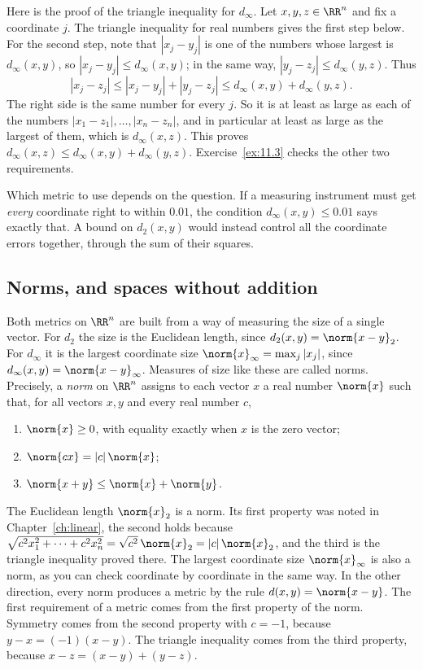 Here is the proof of the triangle inequality for $d_\infty$. Let $x,y,z\in\RR^n$ and fix a coordinate $j$. The triangle inequality for real numbers gives the first step below. For the second step, note that $|x_j-y_j|$ is one of the numbers whose largest is $d_\infty(x,y)$, so $|x_j-y_j|\le d_\infty(x,y)$; in the same way, $|y_j-z_j|\le d_\infty(y,z)$. Thus
\[
|x_j-z_j|\le|x_j-y_j|+|y_j-z_j|\le d_\infty(x,y)+d_\infty(y,z).
\]
The right side is the same number for every $j$. So it is at least as large as each of the numbers $|x_1-z_1|,\ldots,|x_n-z_n|$, and in particular at least as large as the largest of them, which is $d_\infty(x,z)$. This proves $d_\infty(x,z)\le d_\infty(x,y)+d_\infty(y,z)$. Exercise~\ref{ex:11.3} checks the other two requirements.

Which metric to use depends on the question. If a measuring instrument must get \emph{every} coordinate right to within $0.01$, the condition $d_\infty(x,y)\le0.01$ says exactly that. A bound on $d_2(x,y)$ would instead control all the coordinate errors together, through the sum of their squares.

\subsection*{Norms, and spaces without addition}
Both metrics on $\RR^n$ are built from a way of measuring the size of a single vector. For $d_2$ the size is the Euclidean length, since $d_2(x,y)=\norm{x-y}_2$. For $d_\infty$ it is the largest coordinate size $\norm{x}_\infty=\max_j|x_j|$, since $d_\infty(x,y)=\norm{x-y}_\infty$. Measures of size like these are called norms. Precisely, a \emph{norm} on $\RR^n$ assigns to each vector $x$ a real number $\norm{x}$ such that, for all vectors $x,y$ and every real number $c$,
\begin{enumerate}
\item $\norm{x}\ge0$, with equality exactly when $x$ is the zero vector;
\item $\norm{cx}=|c|\,\norm{x}$;
\item $\norm{x+y}\le\norm{x}+\norm{y}$.
\end{enumerate}
The Euclidean length $\norm{x}_2$ is a norm. Its first property was noted in Chapter~\ref{ch:linear}, the second holds because $\sqrt{c^2x_1^2+\cdots+c^2x_n^2}=\sqrt{c^2}\,\norm{x}_2=|c|\,\norm{x}_2$, and the third is the triangle inequality proved there. The largest coordinate size $\norm{x}_\infty$ is also a norm, as you can check coordinate by coordinate in the same way. In the other direction, every norm produces a metric by the rule $d(x,y)=\norm{x-y}$. The first requirement of a metric comes from the first property of the norm. Symmetry comes from the second property with $c=-1$, because $y-x=(-1)(x-y)$. The triangle inequality comes from the third property, because $x-z=(x-y)+(y-z)$.

